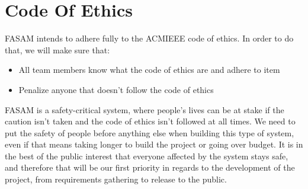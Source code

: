 \chapter{Code Of Ethics}
FASAM intends to adhere fully to the ACM\/IEEE code of ethics.
In order to do that, we will make sure that:
\begin{itemize}
    \item All team members know what the code of ethics are and adhere to item
    \item Penalize anyone that doesn't follow the code of ethics
\end{itemize}

FASAM is a safety-critical system, where people's lives can be at stake if the caution isn't taken and the code of ethics isn't followed at all times. We need to put the safety of people before anything else when building this type of system, even if that means taking longer to build the project or going over budget. It is in the best of the public interest that everyone affected by the system stays safe, and therefore that will be our first priority in regards to the development of the project, from requirements gathering to release to the public.